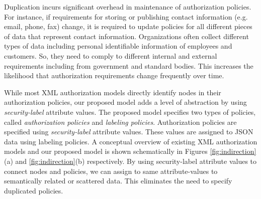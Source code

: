 
Duplication incurs significant overhead in maintenance of authorization policies. For instance, if requirements for storing or publishing contact information (e.g. email, phone, fax) change, it is required to update policies for all different pieces of data that represent contact information. Organizations often collect different types of data including personal identifiable information of employees and customers. So, they need to comply to different internal and external requirements including from government and standard bodies. This increases the likelihood that authorization requirements change frequently over time. 




While most XML authorization models directly identify nodes in their authorization policies, our proposed model adds a level of abstraction by using \textit{security-label} attribute values. The proposed model specifies two types of policies, called \textit{authorization policies} and \textit{labeling policies}.  Authorization policies are specified using \textit{security-label} attribute values. These values are assigned to JSON data using labeling policies. A conceptual overview of existing XML authorization models and our proposed model is  shown schematically in Figures \ref{fig:indirection}(a) and \ref{fig:indirection}(b) respectively. By using security-label attribute values to connect nodes and policies, we can assign to same attribute-values to semantically related or scattered data. This eliminates the need to specify duplicated policies.
	

	
